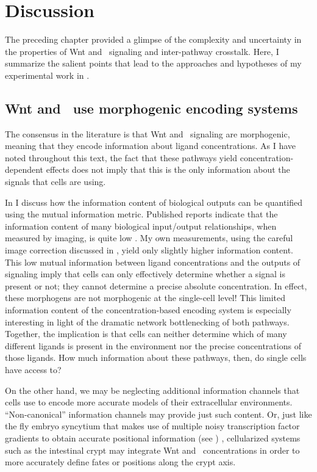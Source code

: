 \section{Discussion}
\label{pathways:discussion}

The preceding chapter provided a glimpse of the complexity and uncertainty
in the properties of Wnt and \tgfbsf\ signaling and inter-pathway crosstalk.
Here, I summarize the salient points that lead to the approaches and hypotheses
of my experimental work in .


\subsection{Wnt and \tgfbsf\ use morphogenic encoding systems}

The consensus in the literature is that Wnt and \tgfbsf\ signaling are
morphogenic, meaning that they encode information about ligand concentrations.
As I have noted throughout this text, the fact that these pathways
yield concentration-dependent effects does not imply that this is the only
information about the signals that cells are using.


In
 I discuss how the information content
of biological outputs can be quantified using the mutual information metric.
Published reports indicate that the information content of many biological
input/output relationships, when measured by imaging,
is quite low \cite{Cheong2011}. My own
measurements, using the careful image correction discussed in 
, yield only slightly higher information content.
This low mutual information between ligand concentrations and the
outputs of signaling imply that cells can only effectively determine
whether a signal is present or not; they cannot determine a precise
absolute concentration. In effect, these morphogens are not
morphogenic at the single-cell level!
This limited information content of the concentration-based encoding system is
especially interesting in light of the dramatic network
bottlenecking of both pathways. Together, the implication is that
cells can neither determine which of many
different ligands is present in the environment nor the precise concentrations of those
ligands. How much information about these pathways, then, do single
cells have access to?


On the other hand, we may be neglecting additional information channels
that cells use to encode more accurate models of their extracellular
environments. ``Non-canonical'' information channels may provide
just such content. Or, just like the fly embryo syncytium that
makes use of multiple noisy
transcription factor gradients to obtain accurate positional
information (see ) \cite{Gregor2007,Dubuis2011},
cellularized systems such as the intestinal crypt may integrate Wnt and \tgfbsf\
concentrations in order to more accurately define fates or positions along
the crypt axis.



